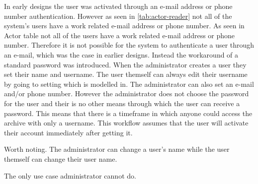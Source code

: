 In early designs the user was activated through an e-mail address or phone number authentication.
However as seen in \cref{tab:actor-reader} not all of the system's users have a work related e-mail address or phone number.
As seen in Actor table not all of the users have a work related e-mail address or phone number.
Therefore it is not possible for the system to authenticate a user through an e-mail, which was the case in earlier designs.
Instead the workaround of a standard password was introduced.
When the administrator creates a user they set their name and username.
The user themself can always edit their username by going to setting which is modelled in.
The administrator can also set an e-mail and/or phone number.
However the administrator does not choose the password for the user and their is no other means through which the user can receive a password.
This means that there is a timeframe in which anyone could access the archive with only a username.
This workflow assumes that the user will activate their account immediately after getting it.







Worth noting. The administrator can change a user's name while the user themself can change their user name.

%

The only use case administrator cannot do.







